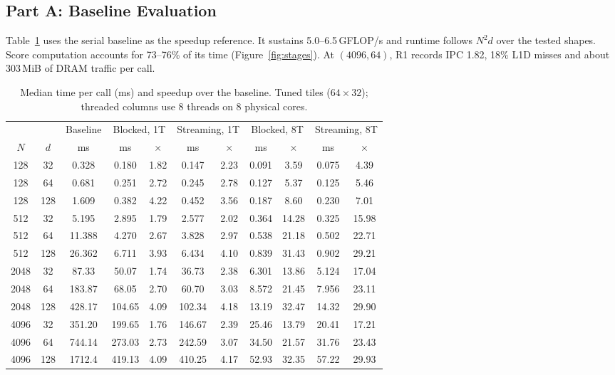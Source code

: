 \documentclass[11pt,a4paper]{article}
\begin{document}
\subsection{Part A: Baseline Evaluation}
Table~\ref{tab:ladder} uses the serial baseline as the speedup reference.
It sustains 5.0--6.5\,GFLOP/s and runtime follows $N^2d$ over the tested shapes.
Score computation accounts for 73--76\% of its time
(Figure~\ref{fig:stages}). At $(4096,64)$, R1 records IPC 1.82,
18\% L1D misses and about 303\,MiB of DRAM traffic per call.

\begin{table}[!htbp]
\centering
\fontsize{9}{11}\selectfont
\setlength{\tabcolsep}{5pt}
\renewcommand{\arraystretch}{1.16}
\caption{Median time per call (ms) and speedup over the baseline. Tuned tiles
($64\times32$); threaded columns use 8 threads on 8 physical cores.}
\label{tab:ladder}
\begin{tabular}{@{}cc c cc cc cc cc@{}}
\toprule
 & & Baseline & \multicolumn{2}{c}{Blocked, 1T} & \multicolumn{2}{c}{Streaming, 1T}
 & \multicolumn{2}{c}{Blocked, 8T} & \multicolumn{2}{c}{Streaming, 8T} \\
\cmidrule(lr){4-5}\cmidrule(lr){6-7}\cmidrule(lr){8-9}\cmidrule(l){10-11}
$N$ & $d$ & ms & ms & $\times$ & ms & $\times$ & ms & $\times$ & ms & $\times$ \\
\midrule
128 & 32  & 0.328  & 0.180  & 1.82 & 0.147  & 2.23 & 0.091  & 3.59  & 0.075  & 4.39  \\
128 & 64  & 0.681  & 0.251  & 2.72 & 0.245  & 2.78 & 0.127  & 5.37  & 0.125  & 5.46  \\
128 & 128 & 1.609  & 0.382  & 4.22 & 0.452  & 3.56 & 0.187  & 8.60  & 0.230  & 7.01  \\
512 & 32  & 5.195  & 2.895  & 1.79 & 2.577  & 2.02 & 0.364  & 14.28 & 0.325  & 15.98 \\
512 & 64  & 11.388 & 4.270  & 2.67 & 3.828  & 2.97 & 0.538  & 21.18 & 0.502  & 22.71 \\
512 & 128 & 26.362 & 6.711  & 3.93 & 6.434  & 4.10 & 0.839  & 31.43 & 0.902  & 29.21 \\
2048 & 32  & 87.33  & 50.07  & 1.74 & 36.73  & 2.38 & 6.301  & 13.86 & 5.124  & 17.04 \\
2048 & 64  & 183.87 & 68.05  & 2.70 & 60.70  & 3.03 & 8.572  & 21.45 & 7.956  & 23.11 \\
2048 & 128 & 428.17 & 104.65 & 4.09 & 102.34 & 4.18 & 13.19  & 32.47 & 14.32  & 29.90 \\
4096 & 32  & 351.20 & 199.65 & 1.76 & 146.67 & 2.39 & 25.46  & 13.79 & 20.41  & 17.21 \\
4096 & 64  & 744.14 & 273.03 & 2.73 & 242.59 & 3.07 & 34.50  & 21.57 & 31.76  & 23.43 \\
4096 & 128 & 1712.4 & 419.13 & 4.09 & 410.25 & 4.17 & 52.93  & 32.35 & 57.22  & 29.93 \\
\bottomrule
\end{tabular}
\end{table}
\end{document}

